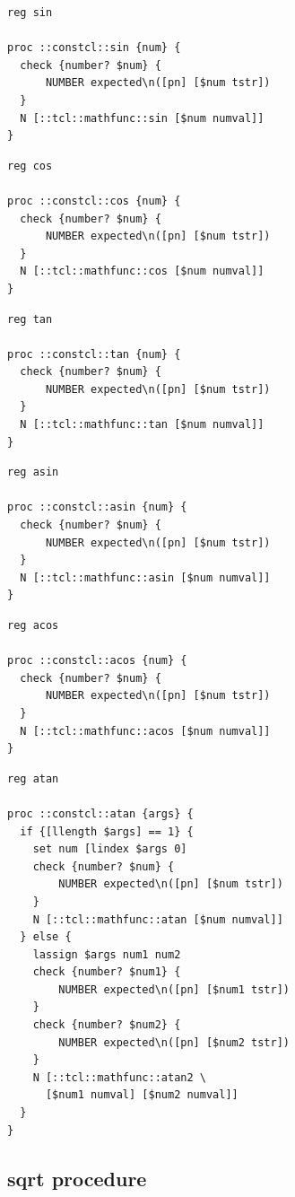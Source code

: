 \documentclass[twoside]{report}
\begin{document}
\begin{lstlisting}
reg sin

proc ::constcl::sin {num} {
  check {number? $num} {
      NUMBER expected\n([pn] [$num tstr])
  }
  N [::tcl::mathfunc::sin [$num numval]]
}
\end{lstlisting}

\begin{lstlisting}
reg cos

proc ::constcl::cos {num} {
  check {number? $num} {
      NUMBER expected\n([pn] [$num tstr])
  }
  N [::tcl::mathfunc::cos [$num numval]]
}
\end{lstlisting}

\begin{lstlisting}
reg tan

proc ::constcl::tan {num} {
  check {number? $num} {
      NUMBER expected\n([pn] [$num tstr])
  }
  N [::tcl::mathfunc::tan [$num numval]]
}
\end{lstlisting}

\begin{lstlisting}
reg asin

proc ::constcl::asin {num} {
  check {number? $num} {
      NUMBER expected\n([pn] [$num tstr])
  }
  N [::tcl::mathfunc::asin [$num numval]]
}
\end{lstlisting}

\begin{lstlisting}
reg acos

proc ::constcl::acos {num} {
  check {number? $num} {
      NUMBER expected\n([pn] [$num tstr])
  }
  N [::tcl::mathfunc::acos [$num numval]]
}
\end{lstlisting}

\begin{lstlisting}
reg atan

proc ::constcl::atan {args} {
  if {[llength $args] == 1} {
    set num [lindex $args 0]
    check {number? $num} {
        NUMBER expected\n([pn] [$num tstr])
    }
    N [::tcl::mathfunc::atan [$num numval]]
  } else {
    lassign $args num1 num2
    check {number? $num1} {
        NUMBER expected\n([pn] [$num1 tstr])
    }
    check {number? $num2} {
        NUMBER expected\n([pn] [$num2 tstr])
    }
    N [::tcl::mathfunc::atan2 \
      [$num1 numval] [$num2 numval]]
  }
}
\end{lstlisting}

\subsection{sqrt procedure}
\label{sqrt-procedure}
\end{document}
